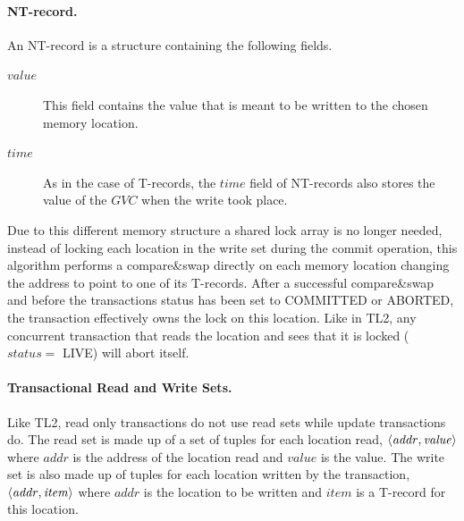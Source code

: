 \paragraph{NT-record.}
An NT-record is a structure containing the following fields.
\begin{description}
\item[$\mathit{value}$]
This field contains the value that is meant to be written to the chosen 
memory location.
\item[$\mathit{time}$]
As in the case of T-records, the $\mathit{time}$ field of NT-records 
also stores the value 
of the $\mathit{GVC}$ when the write took place.
\end{description}

Due to this different memory structure a shared lock array is no longer needed,
instead of locking each location in the write set during the commit operation, this algorithm
performs a compare\&swap directly on each memory location changing the address to point to one of its T-records.
After a successful compare\&swap
 and before the transactions status has been set to COMMITTED or ABORTED, the transaction effectively
owns the lock on this location.
Like in TL2, any concurrent transaction that reads the location and sees that it is locked ($\mathit{status} = $ LIVE) will
abort itself.


\paragraph{Transactional Read and Write Sets.}
Like TL2, read only transactions do not use read sets while update transactions do.
The read set is made up of a set of tuples for each location read, $\left \langle \mathit{addr, value} \right \rangle $
where $\mathit{addr}$ is the address of the location read and $\mathit{value}$ is the value.
The write set is also made up of tuples for each location written by the transaction,
$\left \langle \mathit{addr, item} \right \rangle $ where $\mathit{addr}$ is the location to be written
and $\mathit{item}$ is a T-record for this location.

